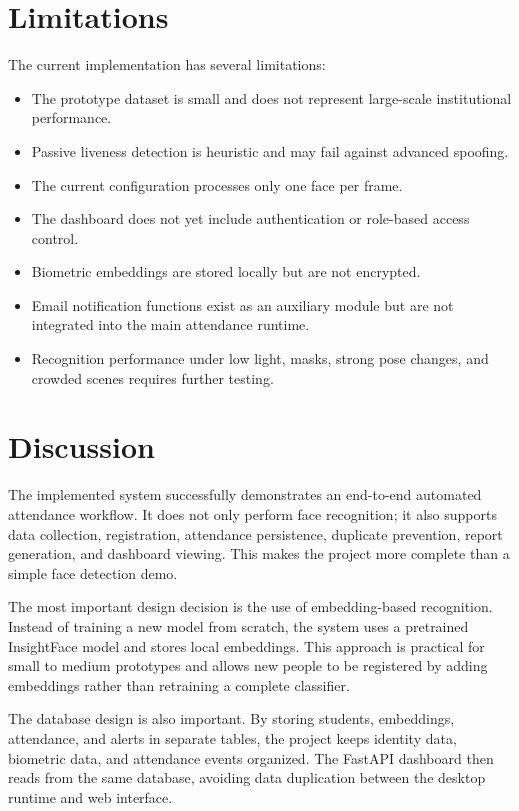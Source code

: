 \documentclass[12pt,a4paper]{report}
\newcommand{\JustifiedNormal}{\fontsize{12}{14}\selectfont\justifying\setlength{\parindent}{0pt}}
\begin{document}
\section{Limitations}
\JustifiedNormal
The current implementation has several limitations:

\begin{itemize}[leftmargin=*]
  \item The prototype dataset is small and does not represent large-scale institutional performance.
  \item Passive liveness detection is heuristic and may fail against advanced spoofing.
  \item The current configuration processes only one face per frame.
  \item The dashboard does not yet include authentication or role-based access control.
  \item Biometric embeddings are stored locally but are not encrypted.
  \item Email notification functions exist as an auxiliary module but are not integrated into the main attendance runtime.
  \item Recognition performance under low light, masks, strong pose changes, and crowded scenes requires further testing.
\end{itemize}

\section{Discussion}
\JustifiedNormal
The implemented system successfully demonstrates an end-to-end automated attendance workflow. It does not only perform face recognition; it also supports data collection, registration, attendance persistence, duplicate prevention, report generation, and dashboard viewing. This makes the project more complete than a simple face detection demo.

The most important design decision is the use of embedding-based recognition. Instead of training a new model from scratch, the system uses a pretrained InsightFace model and stores local embeddings. This approach is practical for small to medium prototypes and allows new people to be registered by adding embeddings rather than retraining a complete classifier.

The database design is also important. By storing students, embeddings, attendance, and alerts in separate tables, the project keeps identity data, biometric data, and attendance events organized. The FastAPI dashboard then reads from the same database, avoiding data duplication between the desktop runtime and web interface.
\end{document}

